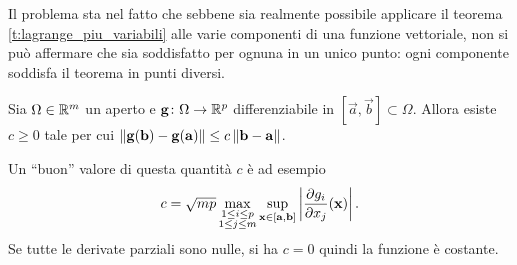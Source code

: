 Il problema sta nel fatto che sebbene sia realmente possibile applicare il teorema \ref{t:lagrange_piu_variabili} alle varie componenti di una funzione vettoriale, non si può affermare che sia soddisfatto per ognuna in un unico punto: ogni componente soddisfa il teorema in punti diversi.
\begin{teorema}
Sia $\Omega\in\mathbb{R}^m$ un aperto e $\mathbf{g}\colon\Omega\to\mathbb{R}^p$ differenziabile in $[\vec a,\vec b]\subset\Omega$. Allora esiste $c\geq 0$ tale per cui $\left\|{\mathbf{g}(\mathbf{b})-\mathbf{g}(\mathbf{a})}\right\|\leq c\left\|{\mathbf{b}-\mathbf{a}}\right\|$.
\end{teorema}
Un ``buon'' valore di questa quantità $c$ è ad esempio
\[
c=\sqrt{mp}\max_{\substack{1\leq i\leq p\\1\leq j\leq m}}\sup_{\mathbf{x}\in[\mathbf{a},\mathbf{b}]}\left|{\frac{\partial {g_i}}{\partial {x_j}}(\mathbf{x})}\right|.
\]
Se tutte le derivate parziali sono nulle, si ha $c=0$ quindi la funzione è costante.

